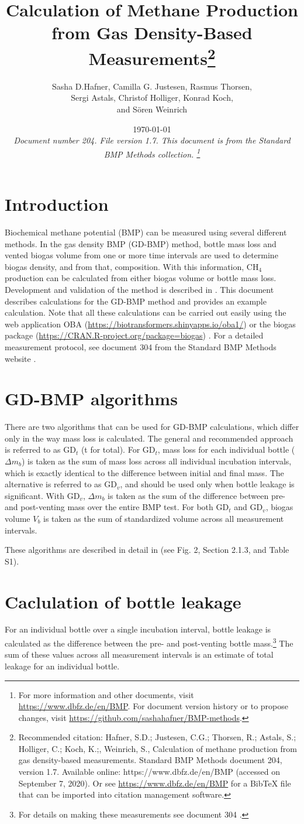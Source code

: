 \documentclass[]{article}
\title {Calculation of Methane Production from Gas Density-Based Measurements\footnote{
  Recommended citation: 
Hafner, S.D.; Justesen, C.G.; Thorsen, R.; Astals, S.; Holliger, C.; Koch, K.;, Weinrich, S., Calculation of methane production from gas density-based measurements. Standard BMP Methods document 204, version 1.7. Available online: https://www.dbfz.de/en/BMP (accessed on September 7, 2020).
\newline
  Or see \url{https://www.dbfz.de/en/BMP} for a BibTeX file that can be imported into citation management software.
}
}
\author{Sasha D.Hafner, Camilla G. Justesen, Rasmus Thorsen, \\ Sergi Astals, Christof Holliger, Konrad Koch, \\ and S{\"o}ren Weinrich
}
\date{\today \\
\bigskip
\textit{
  Document number 204.
  File version 1.7. 
  This document is from the Standard BMP Methods collection.
    \footnote{For more information and other documents, visit \url{https://www.dbfz.de/en/BMP}. 
    For document version history or to propose changes, visit \url{https://github.com/sashahafner/BMP-methods}.}
}
}
\begin{document}
\maketitle

\section{Introduction}
Biochemical methane potential (BMP) can be measured using several different methods.
In the gas density BMP (GD-BMP) method, bottle mass loss and vented biogas volume from one or more time intervals are used to determine biogas density, and from that, composition. 
With this information, CH$_4$ production can be calculated from either biogas volume or bottle mass loss.
Development and validation of the method is described in \citet{justesenDevelopmentValidationLowcost2019}.
This document describes calculations for the GD-BMP method and provides an example calculation.
Note that all these calculations can be carried out easily using the web application OBA (\url{https://biotransformers.shinyapps.io/oba1/}) or the biogas package (\url{https://CRAN.R-project.org/package=biogas}) \citep{hafnerSoftwareBiogasResearch2018}. 
For a detailed measurement protocol, see document 304 from the Standard BMP Methods website \citep{BMPdoc304gasdens}.

\section{GD-BMP algorithms}
\label{sec:algs}
There are two algorithms that can be used for GD-BMP calculations, which differ only in the way mass loss is calculated.
The general and recommended approach is referred to as GD$_t$ (t for total).
For GD$_t$, mass loss for each individual bottle ($\Delta m_b$) is taken as the sum of mass loss across all individual incubation intervals, which is exactly identical to the difference between initial and final mass.
The alternative is referred to as GD$_v$, and should be used only when bottle leakage is significant.
With GD$_v$, $\Delta m_b$ is taken as the sum of the difference between pre- and post-venting mass over the entire BMP test. 
For both GD$_t$ and GD$_v$, biogas volume $V_b$ is taken as the sum of standardized volume across all measurement intervals.

These algorithms are described in detail in \citet{justesenDevelopmentValidationLowcost2019} (see Fig. 2, Section 2.1.3, and Table S1).

\section{Caclulation of bottle leakage}
For an individual bottle over a single incubation interval, bottle leakage is calculated as the difference between the pre- and post-venting bottle mass.\footnote{
  For details on making these measurements see document 304 \citep{BMPdoc304gasdens}.
}
The sum of these values across all measurement intervals is an estimate of total leakage for an individual bottle.
\end{document}

